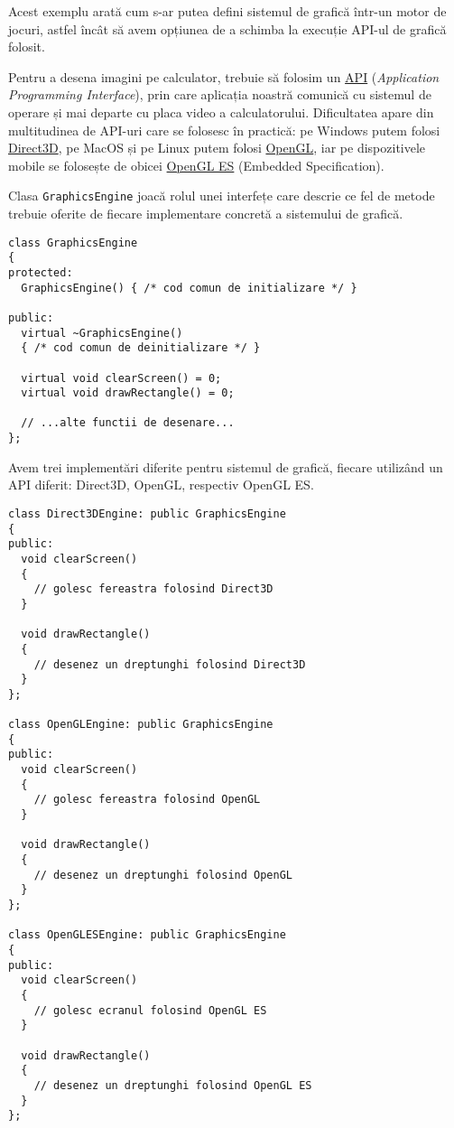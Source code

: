 Acest exemplu arată cum s-ar putea defini sistemul de grafică într-un motor de jocuri, astfel încât să avem opțiunea de a schimba la execuție API-ul de grafică folosit.

Pentru a desena imagini pe calculator, trebuie să folosim un \href{https://en.wikipedia.org/wiki/API}{API} (\textit{Application Programming Interface}), prin care aplicația noastră comunică cu sistemul de operare și mai departe cu placa video a calculatorului. Dificultatea apare din multitudinea de API-uri care se folosesc în practică: pe Windows putem folosi \href{https://learn.microsoft.com/en-us/windows/win32/direct3d}{Direct3D}, pe MacOS și pe Linux putem folosi \href{https://www.opengl.org/}{OpenGL}, iar pe dispozitivele mobile se folosește de obicei \href{https://www.khronos.org/opengles/}{OpenGL ES} (Embedded Specification).

Clasa \texttt{GraphicsEngine} joacă rolul unei interfețe care descrie ce fel de metode trebuie oferite de fiecare implementare concretă a sistemului de grafică.
\begin{lstlisting}
class GraphicsEngine
{
protected:
  GraphicsEngine() { /* cod comun de initializare */ }

public:
  virtual ~GraphicsEngine()
  { /* cod comun de deinitializare */ }

  virtual void clearScreen() = 0;
  virtual void drawRectangle() = 0;

  // ...alte functii de desenare...
};
\end{lstlisting}

Avem trei implementări diferite pentru sistemul de grafică, fiecare utilizând un API diferit: Direct3D, OpenGL, respectiv OpenGL ES.
\begin{lstlisting}
class Direct3DEngine: public GraphicsEngine
{
public:
  void clearScreen()
  {
    // golesc fereastra folosind Direct3D
  }

  void drawRectangle()
  {
    // desenez un dreptunghi folosind Direct3D
  }
};

class OpenGLEngine: public GraphicsEngine
{
public:
  void clearScreen()
  {
    // golesc fereastra folosind OpenGL
  }

  void drawRectangle()
  {
    // desenez un dreptunghi folosind OpenGL
  }
};

class OpenGLESEngine: public GraphicsEngine
{
public:
  void clearScreen()
  {
    // golesc ecranul folosind OpenGL ES
  }

  void drawRectangle()
  {
    // desenez un dreptunghi folosind OpenGL ES
  }
};
\end{lstlisting}


